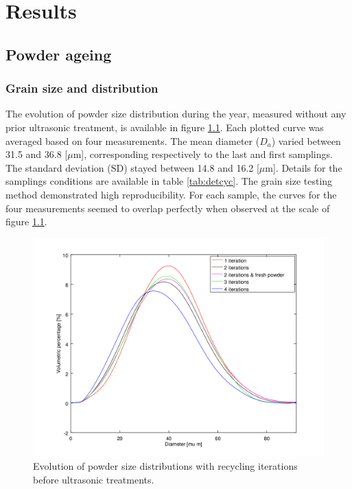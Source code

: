 \chapter{Results}
\label{Chap4}
\section{Powder ageing}

\subsection{Grain size and distribution}
\label{RGSAD}

The evolution of powder size distribution during the year, measured without any prior ultrasonic treatment, is available in figure \ref{fig:granulo}. Each plotted curve was averaged based on four measurements. The mean diameter ($D_a$) varied between 31.5 and 36.8 [$\mu$m], corresponding respectively to the last and first samplings. The standard deviation (SD) stayed between 14.8 and 16.2 [$\mu$m]. Details for the samplings conditions are available  in table \ref{tab:detcyc}. The grain size testing method demonstrated high reproducibility. For each sample, the curves for the four measurements seemed to overlap perfectly when observed at the scale of figure \ref{fig:granulo}.\\%

\begin{figure}[ht]
	\centering
	\includegraphics[scale=1]{Images/Granulo}
	\decoRule
	\caption[Evolution of powder size distributions with recycling iterations before ultrasonic treatments.]{Evolution of powder size distributions with recycling iterations before ultrasonic treatments.}
	\label{fig:granulo}
\end{figure}

